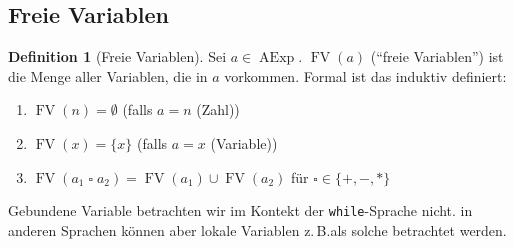 \documentclass[a4paper,12pt]{article}
\theoremstyle{definition}
\newtheorem{definition}{Definition}[section]
\theoremstyle{plain}
\theoremstyle{remark}
\newcommand{\zb}{z.\,B.\;}
\DeclareMathOperator{\AExp}{AExp}
\DeclareMathOperator{\FV}{FV}
\begin{document}
\subsection{Freie Variablen} \label{section:freeVars}

\begin{definition}[Freie Variablen]
    Sei $a \in \AExp$. $\FV(a)$ (``freie Variablen'') ist die Menge aller Variablen, die in $a$ vorkommen. Formal ist das induktiv definiert:
    \begin{enumerate}
        \item $\FV(n) = \emptyset$ \quad\quad\quad (falls $a = n$ (Zahl))
        \item $\FV(x) = \{ x \}$ \quad\quad (falls $a = x$ (Variable))
        \item $\FV(a_1 \;\square\; a_2) = \FV(a_1) \cup \FV(a_2)$ \quad\quad für $\square \in \{ +, -, * \}$
    \end{enumerate}

    Gebundene Variable betrachten wir im Kontekt der \texttt{while}-Sprache nicht. in anderen Sprachen können aber lokale Variablen \zb als solche betrachtet werden.
\end{definition}
\end{document}
